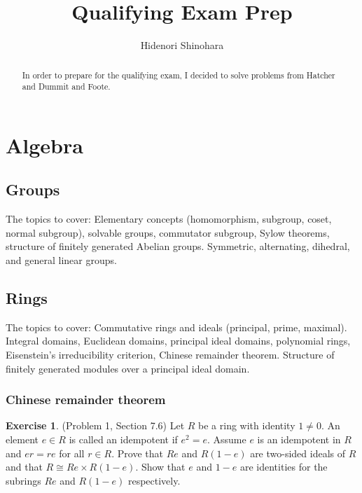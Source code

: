 \documentclass[12pt, psamsfonts]{amsart}
\theoremstyle{definition}
\newtheorem*{exer}{Exercise}
\theoremstyle{remark}
\numberwithin{equation}{section}
\begin{document}
\title{Qualifying Exam Prep}
\author{Hidenori Shinohara}
\maketitle

\begin{abstract}
  In order to prepare for the qualifying exam, I decided to solve problems from Hatcher and Dummit and Foote.
\end{abstract}

\tableofcontents

\section{Algebra}

\subsection{Groups}
The topics to cover: Elementary concepts (homomorphism, subgroup, coset, normal subgroup), solvable groups, commutator subgroup, Sylow theorems, structure of finitely generated Abelian groups.
Symmetric, alternating, dihedral, and general linear groups.

\subsection{Rings}
The topics to cover: Commutative rings and ideals (principal, prime, maximal).
Integral domains, Euclidean domains, principal ideal domains, polynomial rings, Eisenstein's irreducibility criterion, Chinese remainder theorem.
Structure of finitely generated modules over a principal ideal domain.

\subsubsection{Chinese remainder theorem}

\begin{exer}{(Problem 1, Section 7.6)}
  Let $R$ be a ring with identity $1 \ne 0$.
  An element $e \in R$ is called an idempotent if $e^2 = e$.
  Assume $e$ is an idempotent in $R$ and $er = re$ for all $r \in R$.
  Prove that $Re$ and $R(1 - e)$ are two-sided ideals of $R$ and that $R \cong Re \times R(1 - e)$.
  Show that $e$ and $1 - e$ are identities for the subrings $Re$ and $R(1 - e)$ respectively.
\end{exer}
\end{document}
